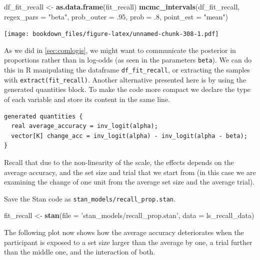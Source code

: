 \documentclass[12pt,]{krantz}
\newenvironment{Shaded}{\begin{snugshade}}{\end{snugshade}}
\newcommand{\DataTypeTok}[1]{\textcolor[rgb]{0.13,0.29,0.53}{#1}}
\newcommand{\FloatTok}[1]{\textcolor[rgb]{0.00,0.00,0.81}{#1}}
\newcommand{\KeywordTok}[1]{\textcolor[rgb]{0.13,0.29,0.53}{\textbf{#1}}}
\newcommand{\NormalTok}[1]{#1}
\newcommand{\StringTok}[1]{\textcolor[rgb]{0.31,0.60,0.02}{#1}}
\theoremstyle{definition}
\theoremstyle{definition}
\theoremstyle{definition}
\theoremstyle{remark}
\begin{document}
\begin{Shaded}
\begin{Highlighting}[]
\NormalTok{df_fit_recall <-}\StringTok{ }\KeywordTok{as.data.frame}\NormalTok{(fit_recall)}
\KeywordTok{mcmc_intervals}\NormalTok{(df_fit_recall,}
               \DataTypeTok{regex_pars =}  \StringTok{"beta"}\NormalTok{,}
               \DataTypeTok{prob_outer =} \FloatTok{.95}\NormalTok{,}
               \DataTypeTok{prob =} \FloatTok{.8}\NormalTok{,}
               \DataTypeTok{point_est =} \StringTok{"mean"}\NormalTok{)}
\end{Highlighting}
\end{Shaded}

\texttt{[image: bookdown\_files/figure-latex/unnamed-chunk-308-1.pdf]}

As we did in \ref{sec:comlogis}, we might want to communicate the posterior in proportions rather than in log-odds (as seen in the parameters \texttt{beta}). We can do this in R manipulating the dataframe \texttt{df\_fit\_recall}, or extracting the samples with \texttt{extract(fit\_recall)}. Another alternative presented here is by using the generated quantities block. To make the code more compact we declare the type of each variable and store its content in the same line.

\begin{verbatim}
generated quantities {
  real average_accuracy = inv_logit(alpha);
  vector[K] change_acc = inv_logit(alpha) - inv_logit(alpha - beta);
}
\end{verbatim}

Recall that due to the non-linearity of the scale, the effects depends on the average accuracy, and the set size and trial that we start from (in this case we are examining the change of one unit from the average set size and the average trial).

Save the Stan code as \texttt{stan\_models/recall\_prop.stan}.

\begin{Shaded}
\begin{Highlighting}[]
\NormalTok{fit_recall <-}\StringTok{ }\KeywordTok{stan}\NormalTok{(}\DataTypeTok{file =} \StringTok{'stan_models/recall_prop.stan'}\NormalTok{,}
                   \DataTypeTok{data =}\NormalTok{ ls_recall_data) }
\end{Highlighting}
\end{Shaded}

The following plot now shows how the average accuracy deteriorates when the participant is exposed to a set size larger than the average by one, a trial further than the middle one, and the interaction of both.
\end{document}

